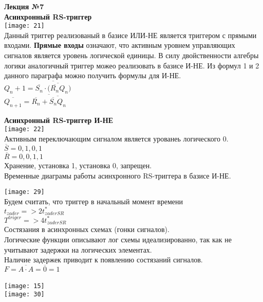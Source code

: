 \LARGE{ \textbf {Лекция №7}}\\
\Large{ \textbf {Асинхронный RS-триггер}}\\
\texttt{[image: 21]} \\
Данный триггер реализованый в базисе ИЛИ-НЕ является триггером с прямыми входами.
\textbf {Прямые входы} означают, что активным уровнем управляющих сигналов является уровень логической единицы.
В силу двойственности алгебры логики аналогичный триггер можео реализовать в базисе И-НЕ.
Из формул 1 и 2 данного параграфа можно получить формулы для И-НЕ.\\
$Q_n+1 =\overline{ \overline{S_n} \cdot \overline{( \overline{R_n} Q_n })}$\\
$\overline{Q_{n+1} }= \overline{  \overline{R_n} + \overline{ \overline{S_n} Q_n }}$



\textbf {Асинхронный RS-триггер И-НЕ}\\
\texttt{[image: 22]} \\

Активным переключающим сигналом является урованеь логического 0.\\
$\overline{S} = 0,1,0,1$\\
$\overline{R} = 0,0,1,1$\\
Хранение, установка 1, установка 0, запрещен.\\

\newpage
Временные диаграмы работы асинхронного RS-триггера в базисе И-НЕ.

\texttt{[image: 29]}\\


Будем считать, что триггер в начальный момент времени\\
$t_{zader} => 2t^*_{zaderSR}$\\
$T^{triger} => 4 t^*_{zaderSR}$ \\

Состязания в асинхронных схемах (гонки сигналов).\\

Логические функции описывают лог схемы идеализированно, так как не учитывают задержки на логических элементах.\\
Наличие задержек приводит к появлению состязаний сигналов.\\
$F = \overline{A \cdot A} = \overline{0} = 1 $\\ \\
\texttt{[image: 15]}\\
\texttt{[image: 30]}\\

